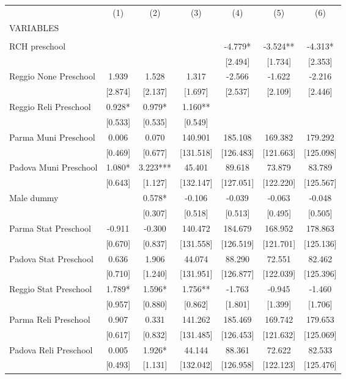 \begin{tabular}{lcccccc} \hline
 & (1) & (2) & (3) & (4) & (5) & (6) \\
VARIABLES &  &  &  &  &  &  \\ \hline
 &  &  &  &  &  &  \\
RCH preschool &  &  &  & -4.779* & -3.524** & -4.313* \\
 &  &  &  & [2.494] & [1.734] & [2.353] \\
Reggio None Preschool & 1.939 & 1.528 & 1.317 & -2.566 & -1.622 & -2.216 \\
 & [2.874] & [2.137] & [1.697] & [2.537] & [2.109] & [2.446] \\
Reggio Reli Preschool & 0.928* & 0.979* & 1.160** &  &  &  \\
 & [0.533] & [0.535] & [0.549] &  &  &  \\
Parma Muni Preschool & 0.006 & 0.070 & 140.901 & 185.108 & 169.382 & 179.292 \\
 & [0.469] & [0.677] & [131.518] & [126.483] & [121.663] & [125.098] \\
Padova Muni Preschool & 1.080* & 3.223*** & 45.401 & 89.618 & 73.879 & 83.789 \\
 & [0.643] & [1.127] & [132.147] & [127.051] & [122.220] & [125.567] \\
Male dummy &  & 0.578* & -0.106 & -0.039 & -0.063 & -0.048 \\
 &  & [0.307] & [0.518] & [0.513] & [0.495] & [0.505] \\
Parma Stat Preschool & -0.911 & -0.300 & 140.472 & 184.679 & 168.952 & 178.863 \\
 & [0.670] & [0.837] & [131.558] & [126.519] & [121.701] & [125.136] \\
Padova Stat Preschool & 0.636 & 1.906 & 44.074 & 88.290 & 72.551 & 82.462 \\
 & [0.710] & [1.240] & [131.951] & [126.877] & [122.039] & [125.396] \\
Reggio Stat Preschool & 1.789* & 1.596* & 1.756** & -1.763 & -0.945 & -1.460 \\
 & [0.957] & [0.880] & [0.862] & [1.801] & [1.399] & [1.706] \\
Parma Reli Preschool & 0.907 & 0.331 & 141.262 & 185.469 & 169.742 & 179.653 \\
 & [0.617] & [0.832] & [131.485] & [126.453] & [121.632] & [125.069] \\
Padova Reli Preschool & 0.005 & 1.926* & 44.144 & 88.361 & 72.622 & 82.533 \\
 & [0.493] & [1.131] & [132.042] & [126.958] & [122.123] & [125.476] \\

\end{tabular}
